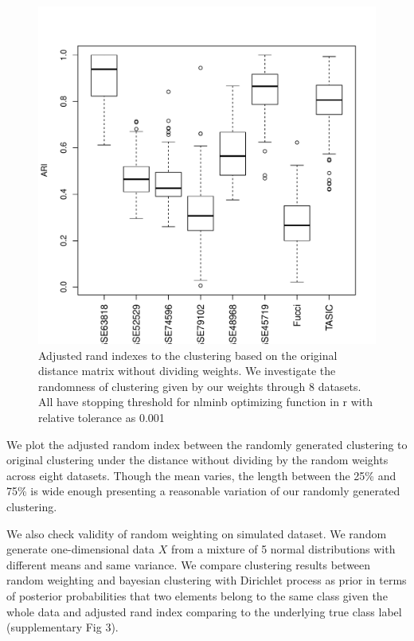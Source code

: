 \documentclass[aoas,preprint]{imsart}
\begin{document}
\begin{figure}[h!]
\includegraphics[scale = 0.8]{Figs/ARI.pdf}
 \caption{Adjusted rand indexes to the clustering based on the original distance matrix without dividing weights. We investigate the randomness of clustering given by our weights through 8 datasets. All have stopping threshold for nlminb optimizing function in r with relative tolerance as 0.001}
  \label{fig:1}
\end{figure}

We plot the adjusted random index between the randomly generated clustering to original clustering under the distance without dividing by the random weights across eight datasets. Though the mean varies, the length between the 25\% and 75\% is wide enough presenting a reasonable variation of our randomly generated clustering.

We also check validity of random weighting on simulated dataset. We random generate one-dimensional data $X$ from a mixture of 5 normal distributions with different means and same variance. We compare clustering results between random weighting and bayesian clustering with Dirichlet process as prior in terms of posterior probabilities that two elements belong to the same class given the whole data and adjusted rand index comparing to the underlying true class label (supplementary Fig 3). 
\end{document}
